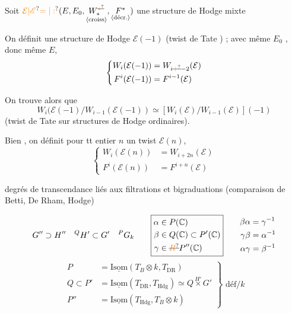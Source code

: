 Soit $\unsure{\mathcal E|\mathscr E}\unsure{=|:}(E,E_0,\underset{\inserted{\text{croiss}}}{W_*^{\deleted{\unsure{*}}}},\underset{\inserted{\text{décr.}}}{F^*})$ une structure de Hodge mixte

On définit une structure de Hodge $\mathcal E(-1)$  (twist de Tate ) ;  avec même $E_0$ , donc même $E$,
\[
\left\{\begin{aligned}
W_i(\mathcal E(-1))&=W_{i\deleted{\unsure{+}}-2}(\mathcal E)\\
F^i(\mathcal E(-1))&=F^{i-1}(\mathcal E)
\end{aligned}\right.
\]

On trouve alors que
\[
 W_i(\mathcal E(-1)/W_{i-1}(\mathcal E(-1))\simeq
 [W_i(\mathcal E)/W_{i-1}(\mathcal E)](-1)
\]
(twist de Tate sur structures de Hodge ordinaires).

Bien , on définit pour tt entier $n$ un twist $\mathcal E(n)$,
\[
\left\{\begin{aligned}
W_i(\mathcal E(n))&=W_{i+2n}(\mathcal E)\\
F^i(\mathcal E(n))&=F^{i+n}(\mathcal E)
\end{aligned}\right.
\]

degrés de transcendance liés aux filtrations et bigraduations (comparaison de Betti, De Rham, Hodge)

\[
G''\supset H''\quad{}^{Q}H'\subset G'\quad{}^{P}G_k
\qquad
\boxed{\begin{aligned}
\alpha&\in P(\mathbb C)\\
\beta&\in Q(\mathbb C)\subset P'(\mathbb C)\\
\gamma&\in \deleted{\unsure{R}}P''(\mathbb C)
\end{aligned}}
\qquad
\begin{aligned}
\beta\alpha&=\gamma^{-1}\\
\gamma\beta&=\alpha^{-1}\\
\alpha\gamma&=\beta^{-1}
\end{aligned}
\]
\[
\left.\begin{aligned}
P&=\underline{\mathrm{Isom}}(T_B\otimes k,T_{\mathrm{DR}})\\
Q\subset P'&=\underline{\mathrm{Isom}}(T_{\mathrm{DR}},T_{\mathrm{Hdg}})\simeq Q\mathbin{\overset{H'}{\times}}G'\\
P''&=\underline{\mathrm{Isom}}(T_{\mathrm{Hdg}},T_B\otimes k)
\end{aligned}\right\}\text{ déf}/k
\]

